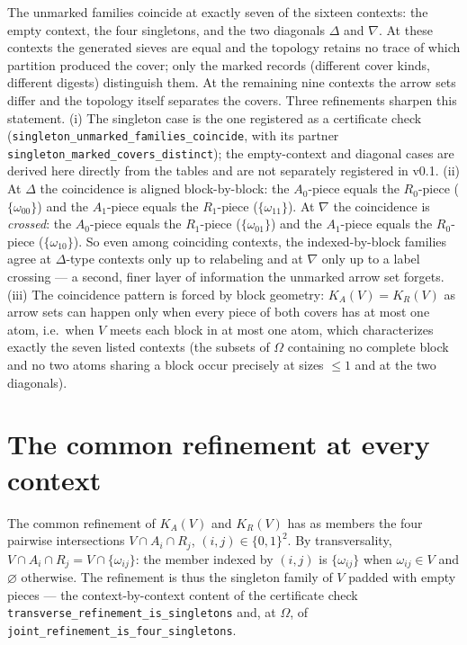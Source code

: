 \begin{finding}
\label{appA:fnd:coincide}
The unmarked families coincide at exactly seven of the sixteen contexts:
the empty context, the four singletons, and the two diagonals $\Delta$ and
$\nabla$. At these contexts the generated sieves are equal and the
topology retains no trace of which partition produced the cover; only the
marked records (different cover kinds, different digests) distinguish
them. At the remaining nine contexts the arrow sets differ and the
topology itself separates the covers. Three refinements sharpen this
statement. (i) The
singleton case is the one registered as a certificate check
(\texttt{singleton\_unmarked\_families\_coincide}, with its partner
\texttt{singleton\_marked\_covers\_distinct}); the empty-context and
diagonal cases are derived here directly from the tables and are not
separately registered in v0.1.
(ii) At $\Delta$ the coincidence is aligned block-by-block: the
$A_0$-piece equals the $R_0$-piece ($\{\omega_{00}\}$) and the $A_1$-piece
equals the $R_1$-piece ($\{\omega_{11}\}$). At $\nabla$ the coincidence
is \emph{crossed}: the $A_0$-piece equals the $R_1$-piece
($\{\omega_{01}\}$) and the $A_1$-piece equals the $R_0$-piece
($\{\omega_{10}\}$). So even among coinciding contexts, the
indexed-by-block families agree at $\Delta$-type contexts only up to
relabeling and at $\nabla$ only up to a label crossing --- a second,
finer layer of information the unmarked arrow set forgets. (iii) The
coincidence pattern is forced by block geometry: $K_A(V) = K_R(V)$ as
arrow sets can happen only when every piece of both covers has at most
one atom, i.e.\ when $V$ meets each block in at most one atom, which
characterizes exactly the seven listed contexts (the subsets of $\Omega$
containing no complete block and no two atoms sharing a block occur
precisely at sizes $\le 1$ and at the two diagonals).
\end{finding}

\section{The common refinement at every context}
\label{appA:sec:refinement}

The common refinement of $K_A(V)$ and $K_R(V)$ has as members the four
pairwise intersections $V \cap A_i \cap R_j$, $(i, j) \in \{0,1\}^2$.
By transversality, $V \cap A_i \cap R_j = V \cap \{\omega_{ij}\}$: the
member indexed by $(i, j)$ is $\{\omega_{ij}\}$ when
$\omega_{ij} \in V$ and $\varnothing$ otherwise. The refinement is thus
the singleton family of $V$ padded with empty pieces --- the
context-by-context content of the certificate check
\texttt{transverse\_refinement\_is\_singletons} and, at $\Omega$, of
\texttt{joint\_refinement\_is\_four\_singletons}.


